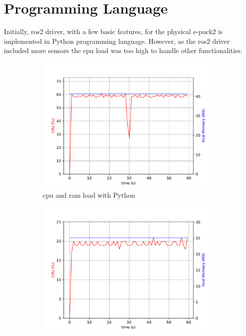 
\section{Programming Language}
Initially, \ac{ros2} driver, with a few basic features, for the physical e-puck2 is implemented in Python programming language. However, as the \ac{ros2} driver included more sensors the \ac{cpu} load was too high to handle other functionalities. 

\begin{figure}[H]
\centering
\begin{subfigure}{.8\textwidth}
  \centering
  \includegraphics[width=\linewidth]{physical/figures/rpi_py_32ms}
  \caption{\ac{cpu} and \ac{ram} load with Python}
  \label{fig:physical:py_vs_cpp:py}
\end{subfigure}
\begin{subfigure}{.8\textwidth}
  \centering
  \includegraphics[width=\linewidth]{physical/figures/rpi_cpp_32ms}

\end{subfigure}
\end{figure}
